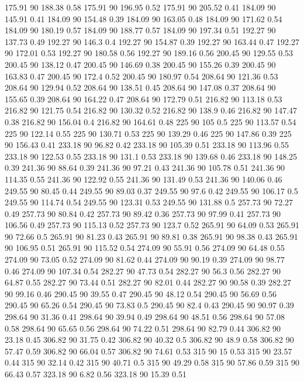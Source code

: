 175.91	90	188.38	0.58
175.91	90	196.95	0.52
175.91	90	205.52	0.41
184.09	90	145.91	0.41
184.09	90	154.48	0.39
184.09	90	163.05	0.48
184.09	90	171.62	0.54
184.09	90	180.19	0.57
184.09	90	188.77	0.57
184.09	90	197.34	0.51
192.27	90	137.73	0.49
192.27	90	146.3	0.4
192.27	90	154.87	0.39
192.27	90	163.44	0.47
192.27	90	172.01	0.53
192.27	90	180.58	0.56
192.27	90	189.16	0.56
200.45	90	129.55	0.53
200.45	90	138.12	0.47
200.45	90	146.69	0.38
200.45	90	155.26	0.39
200.45	90	163.83	0.47
200.45	90	172.4	0.52
200.45	90	180.97	0.54
208.64	90	121.36	0.53
208.64	90	129.94	0.52
208.64	90	138.51	0.45
208.64	90	147.08	0.37
208.64	90	155.65	0.39
208.64	90	164.22	0.47
208.64	90	172.79	0.51
216.82	90	113.18	0.53
216.82	90	121.75	0.54
216.82	90	130.32	0.52
216.82	90	138.9	0.46
216.82	90	147.47	0.38
216.82	90	156.04	0.4
216.82	90	164.61	0.48
225	90	105	0.5
225	90	113.57	0.54
225	90	122.14	0.55
225	90	130.71	0.53
225	90	139.29	0.46
225	90	147.86	0.39
225	90	156.43	0.41
233.18	90	96.82	0.42
233.18	90	105.39	0.51
233.18	90	113.96	0.55
233.18	90	122.53	0.55
233.18	90	131.1	0.53
233.18	90	139.68	0.46
233.18	90	148.25	0.39
241.36	90	88.64	0.39
241.36	90	97.21	0.43
241.36	90	105.78	0.51
241.36	90	114.35	0.55
241.36	90	122.92	0.55
241.36	90	131.49	0.53
241.36	90	140.06	0.46
249.55	90	80.45	0.44
249.55	90	89.03	0.37
249.55	90	97.6	0.42
249.55	90	106.17	0.5
249.55	90	114.74	0.54
249.55	90	123.31	0.53
249.55	90	131.88	0.5
257.73	90	72.27	0.49
257.73	90	80.84	0.42
257.73	90	89.42	0.36
257.73	90	97.99	0.41
257.73	90	106.56	0.49
257.73	90	115.13	0.52
257.73	90	123.7	0.52
265.91	90	64.09	0.53
265.91	90	72.66	0.5
265.91	90	81.23	0.43
265.91	90	89.81	0.38
265.91	90	98.38	0.43
265.91	90	106.95	0.51
265.91	90	115.52	0.54
274.09	90	55.91	0.56
274.09	90	64.48	0.55
274.09	90	73.05	0.52
274.09	90	81.62	0.44
274.09	90	90.19	0.39
274.09	90	98.77	0.46
274.09	90	107.34	0.54
282.27	90	47.73	0.54
282.27	90	56.3	0.56
282.27	90	64.87	0.55
282.27	90	73.44	0.51
282.27	90	82.01	0.44
282.27	90	90.58	0.39
282.27	90	99.16	0.46
290.45	90	39.55	0.47
290.45	90	48.12	0.54
290.45	90	56.69	0.56
290.45	90	65.26	0.54
290.45	90	73.83	0.5
290.45	90	82.4	0.43
290.45	90	90.97	0.39
298.64	90	31.36	0.41
298.64	90	39.94	0.49
298.64	90	48.51	0.56
298.64	90	57.08	0.58
298.64	90	65.65	0.56
298.64	90	74.22	0.51
298.64	90	82.79	0.44
306.82	90	23.18	0.45
306.82	90	31.75	0.42
306.82	90	40.32	0.5
306.82	90	48.9	0.58
306.82	90	57.47	0.59
306.82	90	66.04	0.57
306.82	90	74.61	0.53
315	90	15	0.53
315	90	23.57	0.44
315	90	32.14	0.42
315	90	40.71	0.5
315	90	49.29	0.58
315	90	57.86	0.59
315	90	66.43	0.57
323.18	90	6.82	0.56
323.18	90	15.39	0.51
